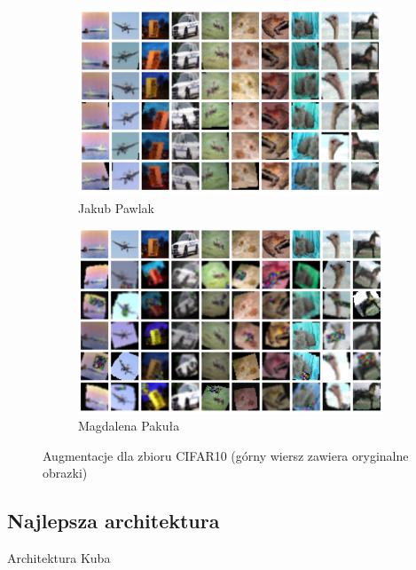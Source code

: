 \documentclass[10pt]{article}
\begin{document}
\begin{figure}[H]\centering
    \begin{subfigure}[t]{.45\textwidth}
        \centering
        \includegraphics[width=.7\linewidth]{img/kuba/cifar/augmentations.png}
        \caption{Jakub Pawlak}
    \end{subfigure}
    \begin{subfigure}[t]{.45\textwidth}
        \centering
        \includegraphics[width=.7\linewidth]{img/magda/augmented_CIFAR}
        \caption{Magdalena Pakuła}
    \end{subfigure}
    \caption{Augmentacje dla zbioru CIFAR10 (górny wiersz zawiera oryginalne obrazki)}
\end{figure}


\subsection*{Najlepsza architektura}

Architektura Kuba
\end{document}
